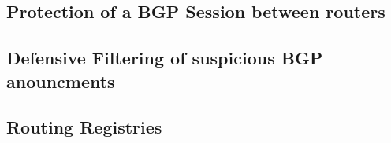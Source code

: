 \documentclass[]{IEEEtran}
\begin{document}
	\subsection{Protection of a BGP Session between routers}
%
%					
%
%				
%				
%			
%
%
	\subsection{Defensive Filtering of suspicious BGP anouncments}
%				

	\subsection{Routing Registries}
%			
			
\end{document}
